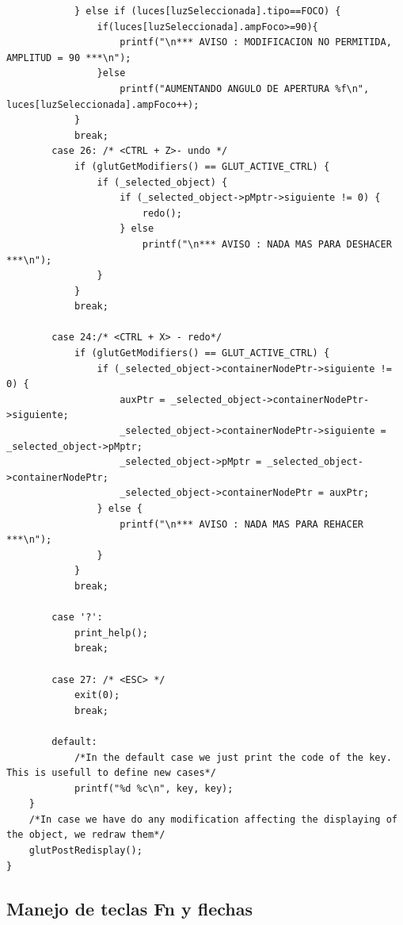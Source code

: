 \documentclass[12pt,a4paper]{article}
\begin{document}
\begin{lstlisting}
            } else if (luces[luzSeleccionada].tipo==FOCO) {
                if(luces[luzSeleccionada].ampFoco>=90){
                    printf("\n*** AVISO : MODIFICACION NO PERMITIDA, AMPLITUD = 90 ***\n");
                }else
                    printf("AUMENTANDO ANGULO DE APERTURA %f\n", luces[luzSeleccionada].ampFoco++);
            }
            break;
        case 26: /* <CTRL + Z>- undo */
            if (glutGetModifiers() == GLUT_ACTIVE_CTRL) {
                if (_selected_object) {
                    if (_selected_object->pMptr->siguiente != 0) {
                        redo();
                    } else
                        printf("\n*** AVISO : NADA MAS PARA DESHACER ***\n");
                }
            }
            break;
            
        case 24:/* <CTRL + X> - redo*/
            if (glutGetModifiers() == GLUT_ACTIVE_CTRL) {
                if (_selected_object->containerNodePtr->siguiente != 0) {
                    auxPtr = _selected_object->containerNodePtr->siguiente;
                    _selected_object->containerNodePtr->siguiente = _selected_object->pMptr;
                    _selected_object->pMptr = _selected_object->containerNodePtr;
                    _selected_object->containerNodePtr = auxPtr;
                } else {
                    printf("\n*** AVISO : NADA MAS PARA REHACER ***\n");
                }
            }
            break;

        case '?':
            print_help();
            break;

        case 27: /* <ESC> */
            exit(0);
            break;
            
        default:
            /*In the default case we just print the code of the key. This is usefull to define new cases*/
            printf("%d %c\n", key, key);
    }
    /*In case we have do any modification affecting the displaying of the object, we redraw them*/
    glutPostRedisplay();
}

\end{lstlisting}

\newpage
\subsection{Manejo de teclas Fn y flechas}
\end{document}
